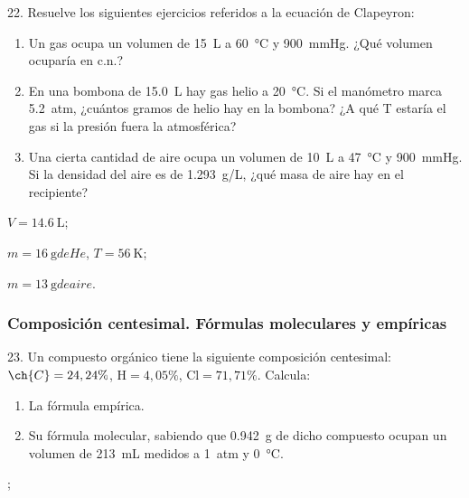 \documentclass[11pt]{article}
\begin{document}
\begin{multicols}{2}
\begin{exercise}
  22. Resuelve los siguientes ejercicios referidos a la ecuación de Clapeyron:
  \begin{enumerate}
    \item Un gas ocupa un volumen de \SI{15}{\liter} a \SI{60}{\celsius} y \SI{900}{\mmHg}. ¿Qué volumen ocuparía en c.n.?
    \item En una bombona de \SI{15.0}{\liter} hay gas helio a \SI{20}{\celsius}. Si el manómetro marca \SI{5.2}{atm}, ¿cuántos gramos de helio hay en la bombona? ¿A qué T estaría el gas si la presión fuera la atmosférica?
    \item Una cierta cantidad de aire ocupa un volumen de \SI{10}{\liter} a \SI{47}{\celsius} y \SI{900}{\mmHg}. Si la densidad del aire es de \SI{1.293}{g/L}, ¿qué masa de aire hay en el recipiente?
  \end{enumerate}
\end{exercise}
\begin{solution}
  \begin{enumerate*}
    \item $V = \SI{14.6}{\liter}$; \item $m = \SI{16}{\gram} de He$, $T = \SI{56}{\kelvin}$; \item $m = \SI{13}{\gram} de aire$.
  \end{enumerate*}
\end{solution}





\subsubsection{Composición centesimal. Fórmulas moleculares y empíricas}

\begin{exercise}
  23. Un compuesto orgánico tiene la siguiente composición centesimal: $\ch{C} = 24,24\%$, $\textrm{H} = 4,05\%$, $\textrm{Cl} = 71,71\%.$ Calcula: %
  \begin{enumerate}
    \item La fórmula empírica.
    \item Su fórmula molecular, sabiendo que \SI{0.942}{\gram} de dicho compuesto ocupan un volumen de \SI{213}{\milli\liter} medidos a \SI{1}{atm} y \SI{0}{\celsius}.
  \end{enumerate}
\end{exercise}
\begin{solution}
  \begin{enumerate*}
    \item {};
    \item {}
  \end{enumerate*}


\end{solution}
\end{multicols}
\end{document}
